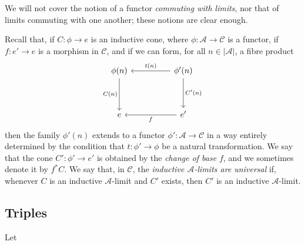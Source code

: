\documentclass{article}
\newcommand{\oldpage}[1]{\marginpar{\footnotesize$\Big\vert$ \textit{p.~#1}}}
\newcommand{\cat}[1]{\mathcal{#1}}
\newcommand{\set}[1]{|#1|}
\begin{document}
We will not cover the notion of a functor \emph{commuting with limits}, nor that of limits commuting with one another;
these notions are clear enough.

Recall that, if $C\colon\phi\to e$ is an inductive cone, where $\phi\colon\cat{A}\to\cat{C}$ is a functor, if $f\colon e'\to e$ is a morphism in $\cat{C}$, and if we can form, for all $n\in\set{\cat{A}}$, a fibre product
\[
  \begin{tikzcd}[sep=huge]
    \phi(n) \ar[d,swap,"C(n)"]
  & \phi'(n) \ar[l,swap,"t(n)"] \ar[d,"C'(n)"]
  \\e
  & e' \ar[l,"f"]
  \end{tikzcd}
\]
then the family $\phi'(n)$ extends to a functor $\phi'\colon\cat{A}\to\cat{C}$ in a way entirely determined by the condition that $t\colon\phi'\to\phi$ be a natural transformation.
We say that the cone $C'\colon\phi'\to e'$ is obtained by the \emph{change of base $f$}, and we sometimes denote it by $f^*C$.
We say that, in $\cat{C}$, the \emph{inductive $\cat{A}$-limits are universal} if, whenever $C$ is an inductive $\cat{A}$-limit and $C'$ exists, then $C'$ is an inductive $\cat{A}$-limit.


\subsection{Triples}

\oldpage{223}
Let





\nocite{*}
\printbibliography[heading=bibintoc,title=Bibliography]
\end{document}
